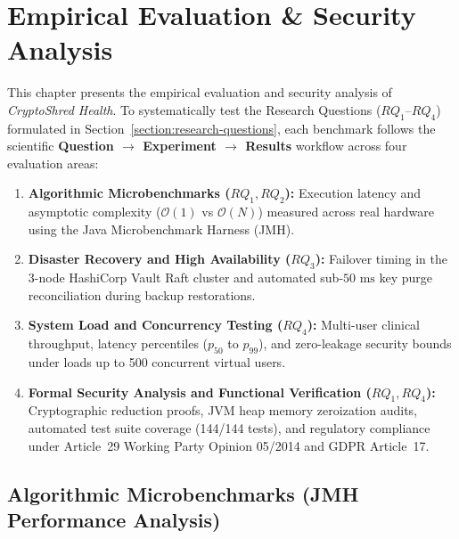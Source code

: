
\chapter{Empirical Evaluation \& Security Analysis}\label{section:evaluation}

This chapter presents the empirical evaluation and security analysis of \textit{CryptoShred Health}. To systematically test the Research Questions ($RQ_1$--$RQ_4$) formulated in Section~\ref{section:research-questions}, each benchmark follows the scientific \textbf{Question $\rightarrow$ Experiment $\rightarrow$ Results} workflow across four evaluation areas:
\begin{enumerate}
    \item \textbf{Algorithmic Microbenchmarks ($RQ_1, RQ_2$):} Execution latency and asymptotic complexity ($\mathcal{O}(1)$ vs $\mathcal{O}(N)$) measured across real hardware using the Java Microbenchmark Harness (JMH).
    \item \textbf{Disaster Recovery and High Availability ($RQ_3$):} Failover timing in the 3-node HashiCorp Vault Raft cluster and automated sub-$50\text{~ms}$ key purge reconciliation during backup restorations.
    \item \textbf{System Load and Concurrency Testing ($RQ_4$):} Multi-user clinical throughput, latency percentiles ($p_{50}$ to $p_{99}$), and zero-leakage security bounds under loads up to 500 concurrent virtual users.
    \item \textbf{Formal Security Analysis and Functional Verification ($RQ_1, RQ_4$):} Cryptographic reduction proofs, JVM heap memory zeroization audits, automated test suite coverage (144/144 tests), and regulatory compliance under Article~29 Working Party Opinion 05/2014 and GDPR Article~17.
\end{enumerate}


\section{Algorithmic Microbenchmarks (JMH Performance Analysis)}\label{section:algorithmic-microbenchmarks}

